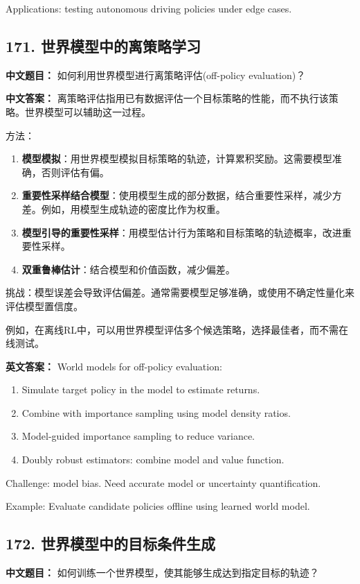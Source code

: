 \documentclass[10pt,a4paper]{ctexart}
\begin{document}
Applications: testing autonomous driving policies under edge cases.

\subsection*{171. 世界模型中的离策略学习}
\textbf{中文题目：} 如何利用世界模型进行离策略评估(off-policy evaluation)？

\textbf{中文答案：}  
离策略评估指用已有数据评估一个目标策略的性能，而不执行该策略。世界模型可以辅助这一过程。

方法：
\begin{enumerate}
    \item \textbf{模型模拟}：用世界模型模拟目标策略的轨迹，计算累积奖励。这需要模型准确，否则评估有偏。
    \item \textbf{重要性采样结合模型}：使用模型生成的部分数据，结合重要性采样，减少方差。例如，用模型生成轨迹的密度比作为权重。
    \item \textbf{模型引导的重要性采样}：用模型估计行为策略和目标策略的轨迹概率，改进重要性采样。
    \item \textbf{双重鲁棒估计}：结合模型和价值函数，减少偏差。
\end{enumerate}

挑战：模型误差会导致评估偏差。通常需要模型足够准确，或使用不确定性量化来评估模型置信度。

例如，在离线RL中，可以用世界模型评估多个候选策略，选择最佳者，而不需在线测试。

\textbf{英文答案：}  
World models for off-policy evaluation:

\begin{enumerate}
    \item Simulate target policy in the model to estimate returns.
    \item Combine with importance sampling using model density ratios.
    \item Model-guided importance sampling to reduce variance.
    \item Doubly robust estimators: combine model and value function.
\end{enumerate}

Challenge: model bias. Need accurate model or uncertainty quantification.

Example: Evaluate candidate policies offline using learned world model.

\subsection*{172. 世界模型中的目标条件生成}
\textbf{中文题目：} 如何训练一个世界模型，使其能够生成达到指定目标的轨迹？
\end{document}
